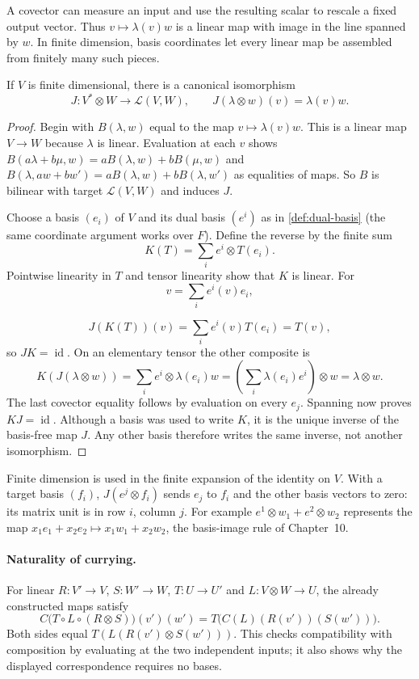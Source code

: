 A covector can measure an input and use the resulting scalar to rescale
a fixed output vector. Thus $v\mapsto\lambda(v)w$ is a linear map
with image in the line spanned by $w$. In finite dimension, basis
coordinates let every linear map be assembled from finitely many such pieces.

\begin{proposition}
If $V$ is finite dimensional, there is a canonical isomorphism
\[
J:V^*\otimes W\longrightarrow\mathcal L(V,W),\qquad
J(\lambda\otimes w)(v)=\lambda(v)w.
\]
\end{proposition}
\begin{proof}
Begin with $B(\lambda,w)$ equal to the map $v\mapsto\lambda(v)w$.
This is a linear map $V\to W$ because $\lambda$ is linear. Evaluation at
each $v$ shows
$B(a\lambda+b\mu,w)=aB(\lambda,w)+bB(\mu,w)$ and
$B(\lambda,aw+bw')=aB(\lambda,w)+bB(\lambda,w')$ as equalities of maps.
So $B$ is bilinear with target $\mathcal L(V,W)$ and induces $J$.

Choose a basis $(e_i)$ of $V$ and its dual basis $(e^i)$ as in
\cref{def:dual-basis} (the same coordinate argument works over $F$).
Define the reverse
by the finite sum
\[
K(T)=\sum_i e^i\otimes T(e_i).
\]
Pointwise linearity in $T$ and tensor linearity show that $K$ is linear.
For
\[
v=\sum_i e^i(v)e_i,
\]

\[
J(K(T))(v)=\sum_i e^i(v)T(e_i)=T(v),
\]
so $JK=\operatorname{id}$. On an elementary tensor the other composite is
\[
K(J(\lambda\otimes w))=\sum_i e^i\otimes\lambda(e_i)w
=\left(\sum_i\lambda(e_i)e^i\right)\otimes w=\lambda\otimes w.
\]
The last covector equality follows by evaluation on every $e_j$.
Spanning now proves $KJ=\operatorname{id}$. Although a basis was used to
write $K$, it is the unique inverse of the basis-free map $J$. Any other
basis therefore writes the same inverse, not another isomorphism.
\end{proof}
Finite dimension is used in the finite expansion of the identity on $V$.
With a target basis $(f_i)$, $J(e^j\otimes f_i)$ sends $e_j$ to $f_i$
and the other basis vectors to zero: its matrix unit is in row $i$, column $j$.
For example $e^1\otimes w_1+e^2\otimes w_2$ represents the map
$x_1e_1+x_2e_2\mapsto x_1w_1+x_2w_2$, the basis-image rule of Chapter~10.


\paragraph{Naturality of currying.}
For linear $R:V'\to V$, $S:W'\to W$, $T:U\to U'$ and
$L:V\otimes W\to U$, the already constructed maps satisfy
\[
C\bigl(T\circ L\circ(R\otimes S)\bigr)(v')(w')
=T\bigl(C(L)(R(v'))(S(w'))\bigr).
\]
Both sides equal $T(L(R(v')\otimes S(w')))$. This checks compatibility
with composition by evaluating at the two independent inputs; it also
shows why the displayed correspondence requires no bases.

